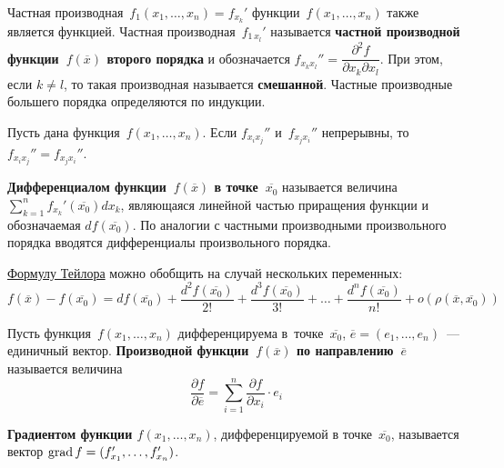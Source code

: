 Частная производная~$f_1(x_1, \ldots, x_n) = f_{x_k}'$ функции~$f(x_1, \ldots, x_n)$ также является функцией.
Частная производная~$f_{1\, x_l}'$ называется \textbf{частной производной функции~$f(\overline x)$ второго порядка} и обозначается $f_{x_k x_l}'' = \dfrac{\partial^2 f}{\partial x_k \partial x_l}$.
При этом, если $k \neq l$, то такая производная называется \textbf{смешанной}.
Частные производные большего порядка определяются по индукции.

\begin{theorem}[Шварца]
Пусть дана функция~$f(x_1, \ldots, x_n)$.
Если $f_{x_i x_j}''$ и~$f_{x_j x_i}''$ непрерывны, то $f_{x_i x_j}'' = f_{x_j x_i}''$.
\end{theorem}

\textbf{Дифференциалом функции~$f(\overline x)$ в точке~$\overline{x_0}$} называется величина $\displaystyle \sum_{k=1}^n f_{x_k}'(\overline{x_0}) dx_k$, являющаяся линейной частью приращения функции и обозначаемая $df(\overline{x_0})$.
По аналогии с частными производными произвольного порядка вводятся дифференциалы произвольного порядка.

\hyperref[eq:Taylor_series]{Формулу Тейлора} можно обобщить на случай нескольких переменных:
\begin{equation}
\label{eq:Taylor_series_for_several_variables}
f(\overline x) - f(\overline{x_0}) =
df(\overline{x_0}) + \frac{d^2 f(\overline{x_0})}{2!} + \frac{d^3 f(\overline{x_0})}{3!} + \ldots + \frac{d^n f(\overline{x_0})}{n!} + o(\rho(\overline x, \overline{x_0}))
\end{equation}

 Пусть функция~$f(x_1, \ldots, x_n)$ дифференцируема в~точке~$\overline{x_0}$, $\overline e = (e_1, \ldots, e_n)$~--- единичный вектор.
\textbf{Производной функции~$f(\overline x)$ по направлению~$\overline e$} называется величина
\begin{equation*}
\frac{\partial f}{\partial \overline e} = \sum_{i=1}^n \frac{\partial f}{\partial x_i} \cdot e_i
\end{equation*}

 \textbf{Градиентом функции $f(x_1, \ldots, x_n)$}, дифференцируемой в точке~$\overline{x_0}$, называется вектор $\grad f \opbr= (f_{x_1}', \ldots, f_{x_n}')$.